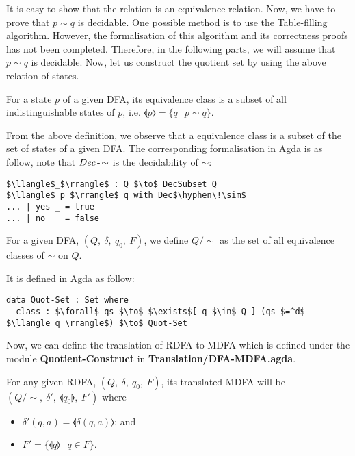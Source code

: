 \par It is easy to show that the relation is an equivalence
relation. Now, we have to prove that \(p \sim q\) is decidable. One
possible method is to use the Table-filling algorithm. However, the
formalisation of this algorithm and its correctness proofs has not
been completed. Therefore, in the following parts, we will assume that
\(p \sim q\) is decidable. Now, let us construct the quotient set by using the above
relation of states. 

\begin{defn}
\noindent For a state \(p\) of a given DFA, its equivalence
class is a subset of all indistinguishable states of \(p\), i.e. \(\llangle p
\rrangle = \{q\ |\ p \sim q\}\). 
\end{defn}

\par From the above definition, we observe that a equivalence class
is a subset of the set of states of a given DFA. The corresponding formalisation in
Agda is as follow, note that \(Dec\operatorname{-}\!\sim\) is the decidability of
\(\sim\):
\begin{lstlisting}[mathescape=true,xleftmargin=.3\textwidth]
$\llangle$_$\rrangle$ : Q $\to$ DecSubset Q
$\llangle$ p $\rrangle$ q with Dec$\hyphen\!\sim$
... | yes _ = true
... | no  _ = false
\end{lstlisting}

\begin{defn}
\noindent For a given DFA, \((Q,\ \delta,\ q_0,\ F)\), we define
\(Q/\!\sim\) as the set of all equivalence classes of
\(\sim\) on \(Q\). 
\end{defn}

\par It is defined in Agda as follow: 
\begin{lstlisting}[mathescape=true,xleftmargin=.3\textwidth]
data Quot-Set : Set where
  class : $\forall$ qs $\to$ $\exists$[ q $\in$ Q ] (qs $=^d$ $\llangle q \rrangle$) $\to$ Quot-Set
\end{lstlisting}

\par Now, we can define the translation of RDFA to MDFA which is
defined under the module \textbf{Quotient-Construct } in \textbf{Translation/DFA-MDFA.agda}. 
\begin{defn}
\label{defn:quotient}
\noindent For any given RDFA, \((Q,\ \delta,\ q_0,\ F)\), its
translated MDFA will be \((Q/\!\sim,\ \delta',\ \llangle q_0 \rrangle,\ F')\) where
\begin{itemize}[nolistsep]
\item \(\delta'(q,a) = \llangle \delta(q,a) \rrangle\); and
\item \(F' = \{\llangle q \rrangle\ |\ q \in F\}\).
\end{itemize}
\end{defn}

